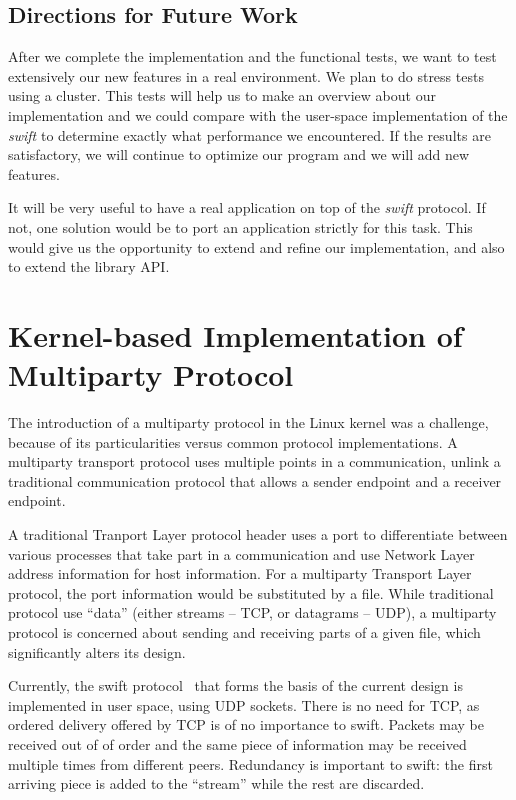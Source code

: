 \subsection{Directions for Future Work}

After we complete the implementation and the functional tests, we want to test
extensively our new features in a real environment. We plan to do stress tests
using a cluster. This tests will help us to make an overview about our
implementation and we could compare with the user-space implementation of the
\textit{swift} to determine exactly what performance we encountered. If the
results are satisfactory, we will continue to optimize our program and we will
add new features.

It will be very useful to have a real application on top of the \textit{swift}
protocol. If not, one solution would be to port an application strictly for
this task. This would give us the opportunity to extend and refine our
implementation, and also to extend the library API.

\section{Kernel-based Implementation of Multiparty Protocol}

The introduction of a multiparty protocol in the Linux kernel was a challenge,
because of its particularities versus common protocol implementations. A
multiparty transport protocol uses multiple points in a communication, unlink
a traditional communication protocol that allows a sender endpoint and a
receiver endpoint.

A traditional Tranport Layer protocol header uses a port to differentiate
between various processes that take part in a communication and use Network
Layer address information for host information. For a multiparty Transport
Layer protocol, the port information would be substituted by a file. While
traditional protocol use ``data'' (either streams -- TCP, or datagrams --
UDP), a multiparty protocol is concerned about sending and receiving parts of
a given file, which significantly alters its design.

Currently, the swift protocol~\cite{TODO} that forms the basis of the
current design is implemented in user space, using UDP sockets. There is no
need for TCP, as ordered delivery offered by TCP is of no importance to swift.
Packets may be received out of of order and the same piece of information may
be received multiple times from different peers. Redundancy is important to
swift: the first arriving piece is added to the ``stream'' while the rest are
discarded.

